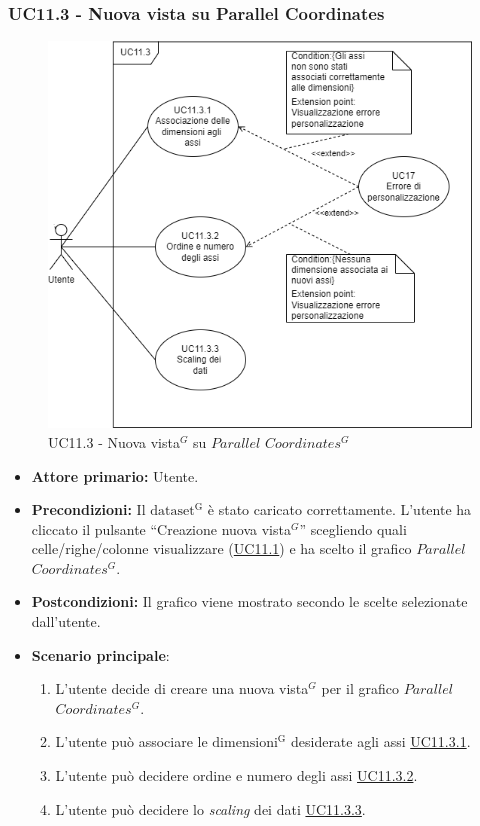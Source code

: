 \subsubsection{UC11.3 - Nuova vista su Parallel Coordinates}
\label{sec:UC11.3}
\begin{figure}[h!]
	\centering
	\includegraphics[scale=0.60]{../../assets/creazionevista_parallel_coordinates.png}
	\caption{UC11.3 - Nuova vista$^{G}$ su $Parallel$ $Coordinates^{G}$}
\end{figure}
\begin{itemize}
    \item \textbf{Attore primario:} Utente.
    \item \textbf{Precondizioni:} Il ${\mathrm{dataset^{G}}}$ è stato caricato correttamente. L'utente ha cliccato il pulsante ``Creazione nuova vista$^{G}$'' scegliendo quali celle/righe/colonne visualizzare (\hyperref[sec:UC11.1]{UC11.1}) e ha scelto il grafico $Parallel$ $Coordinates^{G}$.
    \item \textbf{Postcondizioni:} Il grafico viene mostrato secondo le scelte selezionate dall'utente.
    \item \textbf{Scenario principale}:
    \begin{enumerate}
		\item L'utente decide di creare una nuova vista$^{G}$ per il grafico $Parallel$ $Coordinates^{G}$.
		\item L'utente può associare le ${\mathrm{dimensioni^{G}}}$ desiderate agli assi \hyperref[sec:UC11.3.1]{UC11.3.1}.
		\item L'utente può decidere ordine e numero degli assi \hyperref[sec:UC11.3.2]{UC11.3.2}.
		\item L'utente può decidere lo \textit{scaling} dei dati \hyperref[sec:UC11.3.3]{UC11.3.3}.
	\end{enumerate}
\end{itemize}


